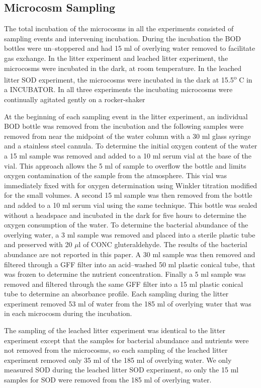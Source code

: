 \subsection{Microcosm Sampling}
The total incubation of the microcosms in all the experiments consisted of sampling events and intervening incubation. During the incubation the BOD bottles were un--stoppered and had 15 ml of overlying water removed to facilitate gas exchange. In the litter experiment and leached litter experiment, the microcosms were incubated in the dark, at room temperature. In the leached litter SOD experiment, the microcosms were incubated in the dark at 15.5\textsuperscript{o} C in a INCUBATOR. In all three experiments the incubating microcosms were continually agitated gently on a rocker-shaker

At the beginning of each sampling event in the litter experiment, an individual BOD bottle was removed from the incubation and the following samples were removed from near the midpoint of the water column with a 30 ml glass syringe and a stainless steel cannula. To determine the initial oxygen content of the water a 15 ml sample was removed and added to a 10 ml serum vial at the base of the vial. This approach allows the 5 ml of sample to overflow the bottle and limits oxygen contamination of the sample from the atmosphere. This vial was immediately fixed with for oxygen determination using Winkler titration \cite{CARPENTER_1965} modified for the small volumes. A second 15 ml sample was then removed from the bottle and added to a 10 ml serum vial using the same technique. This bottle was sealed without a headspace and incubated in the dark for five hours to determine the oxygen consumption of the water. To determine the bacterial abundance of the overlying water, a 3 ml sample was removed and placed into a sterile plastic tube and preserved with 20 $\mu$l of CONC gluteraldehyde. The results of the bacterial abundance are not reported in this paper. A 30 ml sample was then removed and filtered through a GFF filter into an acid--washed 50 ml plastic conical tube, that was frozen to determine the nutrient concentration. Finally a 5 ml sample was removed and filtered through the same GFF filter into a 15 ml plastic conical tube to determine an absorbance profile. Each sampling during the litter experiment removed 53 ml of water from the 185 ml of overlying water that was in each microcosm during the incubation. 

The sampling of the leached litter experiment was identical to the litter experiment except that the samples for bacterial abundance and nutrients were not removed from the microcosms, so each sampling of the leached litter experiment removed only 35 ml of the 185 ml of overlying water. We only measured SOD during the leached litter SOD experiment, so only the 15 ml samples for SOD were removed from the 185 ml of overlying water.

